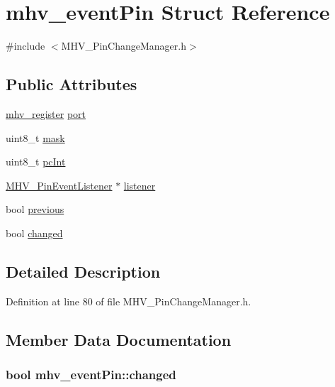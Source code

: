 \hypertarget{structmhv__event_pin}{\section{mhv\-\_\-event\-Pin Struct Reference}
\label{structmhv__event_pin}
}


{\ttfamily \#include $<$M\-H\-V\-\_\-\-Pin\-Change\-Manager.\-h$>$}

\subsection*{Public Attributes}
\begin{DoxyCompactItemize}
\item 
\hyperlink{_m_h_v__io_8h_ae6ae31314a14d3c344aa74d6504f3401}{mhv\-\_\-register} \hyperlink{structmhv__event_pin_a9ee4dff40bf4ba67a3b177b945a68f48}{port}
\item 
uint8\-\_\-t \hyperlink{structmhv__event_pin_a28a7cf2eb643ead207ce1e1c4dcab533}{mask}
\item 
uint8\-\_\-t \hyperlink{structmhv__event_pin_a94d11da6ceacb80c9c2f30edbe99bd0e}{pc\-Int}
\item 
\hyperlink{class_m_h_v___pin_event_listener}{M\-H\-V\-\_\-\-Pin\-Event\-Listener} $\ast$ \hyperlink{structmhv__event_pin_a90fdc2fdc188f1b614a41b45a7f6ba6c}{listener}
\item 
bool \hyperlink{structmhv__event_pin_a6c6bc6a868d6402c34a5024447473618}{previous}
\item 
bool \hyperlink{structmhv__event_pin_ac97303a03e69848a7c32f8e4f61ff824}{changed}
\end{DoxyCompactItemize}


\subsection{Detailed Description}


Definition at line 80 of file M\-H\-V\-\_\-\-Pin\-Change\-Manager.\-h.



\subsection{Member Data Documentation}
\hypertarget{structmhv__event_pin_ac97303a03e69848a7c32f8e4f61ff824}{
\subsubsection[{changed}]{\setlength{\rightskip}{0pt plus 5cm}bool mhv\-\_\-event\-Pin\-::changed}}\label{structmhv__event_pin_ac97303a03e69848a7c32f8e4f61ff824}


